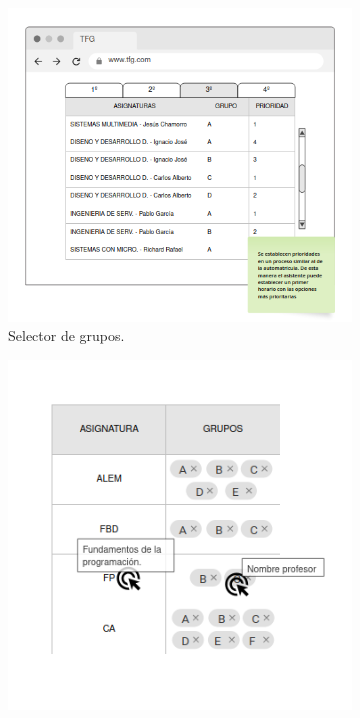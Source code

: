 \begin{figure}[!tb]
    \begin{subfigure}[b]{0.35\textwidth}
        \includegraphics[width=\textwidth]{./imagenes/Mockup_asignaturas.png}
        \caption{Selector de grupos.}
    \end{subfigure}
    \hfill
    \begin{subfigure}[b]{0.35\textwidth}
        \includegraphics[width=\textwidth]{./imagenes/Mockup_grupos.png}

\end{subfigure}
\end{figure}
